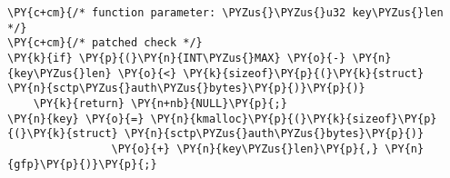 \begin{Verbatim}[commandchars=\\\{\},codes={\catcode`\$=3\catcode`\^=7\catcode`\_=8}]
\PY{c+cm}{/* function parameter: \PYZus{}\PYZus{}u32 key\PYZus{}len */}
\PY{c+cm}{/* patched check */}
\PY{k}{if} \PY{p}{(}\PY{n}{INT\PYZus{}MAX} \PY{o}{-} \PY{n}{key\PYZus{}len} \PY{o}{<} \PY{k}{sizeof}\PY{p}{(}\PY{k}{struct} \PY{n}{sctp\PYZus{}auth\PYZus{}bytes}\PY{p}{)}\PY{p}{)}
    \PY{k}{return} \PY{n+nb}{NULL}\PY{p}{;}
\PY{n}{key} \PY{o}{=} \PY{n}{kmalloc}\PY{p}{(}\PY{k}{sizeof}\PY{p}{(}\PY{k}{struct} \PY{n}{sctp\PYZus{}auth\PYZus{}bytes}\PY{p}{)}
                \PY{o}{+} \PY{n}{key\PYZus{}len}\PY{p}{,} \PY{n}{gfp}\PY{p}{)}\PY{p}{;}
\end{Verbatim}

